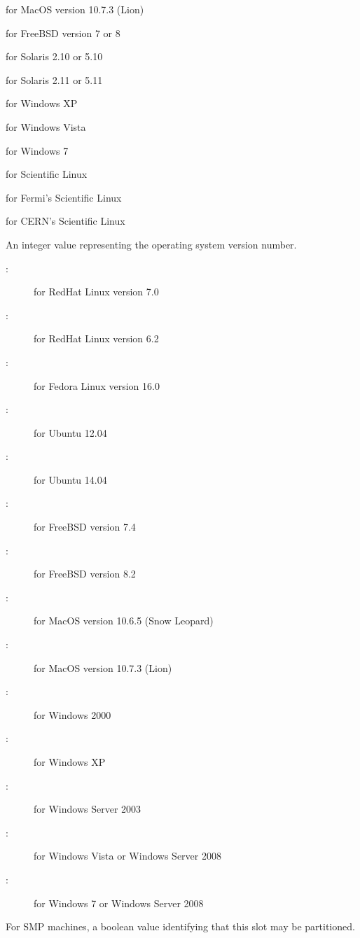 \begin{description}
\begin{description}
for MacOS version 10.7.3 (Lion)
	\item[\AdStr{FreeBSD}:] for FreeBSD version 7 or 8
	\item[\AdStr{SOLARIS5.10}:] for Solaris 2.10 or 5.10
	\item[\AdStr{SOLARIS5.11}:] for Solaris 2.11 or 5.11
	\item[\AdStr{XP}:] for Windows XP
	\item[\AdStr{Vista}:] for Windows Vista
	\item[\AdStr{7}:] for Windows 7
	\item[\AdStr{SL}:] for Scientific Linux
	\item[\AdStr{SLFermi}:] for Fermi's Scientific Linux
	\item[\AdStr{SLCern}:] for CERN's Scientific Linux
	\end{description}
%
\item[\AdAttr{OpSysVer}:] An integer value representing the operating system
version number.
	\begin{description}
	\item[:] for RedHat Linux version 7.0
	\item[:] for RedHat Linux version 6.2
	\item[:] for Fedora Linux version 16.0
	\item[:] for Ubuntu 12.04
	\item[:] for Ubuntu 14.04
	\item[:] for FreeBSD version 7.4
	\item[:] for FreeBSD version 8.2
	\item[:] for MacOS version 10.6.5 (Snow Leopard)
	\item[:] for MacOS version 10.7.3 (Lion)
	\item[:] for Windows 2000
	\item[:] for Windows XP
	\item[:] for Windows Server 2003
	\item[:] for Windows Vista or Windows Server 2008
	\item[:] for Windows 7 or Windows Server 2008
	\end{description}
%
\label{PartitionableSlot-machine-attribute} 
\item[\AdAttr{PartitionableSlot}:] For SMP machines,
a boolean value identifying that this slot may be partitioned.

\end{description}
